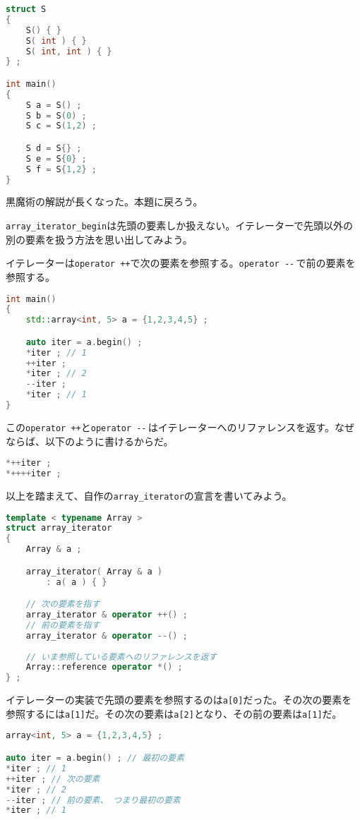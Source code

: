 \begin{lstlisting}[language={C++}]
struct S
{
    S() { }
    S( int ) { }
    S( int, int ) { }
} ;

int main()
{
    S a = S() ;
    S b = S(0) ;
    S c = S(1,2) ;

    S d = S{} ;
    S e = S{0} ;
    S f = S{1,2} ;
}
\end{lstlisting}

黒魔術の解説が長くなった。本題に戻ろう。

\texttt{array\_iterator\_begin}は先頭の要素しか扱えない。イテレーターで先頭以外の別の要素を扱う方法を思い出してみよう。

イテレーターは\texttt{operator ++}で次の要素を参照する。\texttt{operator {-}{-}}\,で前の要素を参照する。

\begin{lstlisting}[language={C++}]
int main()
{
    std::array<int, 5> a = {1,2,3,4,5} ;

    auto iter = a.begin() ;
    *iter ; // 1
    ++iter ;
    *iter ; // 2
    --iter ;
    *iter ; // 1
}
\end{lstlisting}

この\texttt{operator ++}と\texttt{operator {-}{-}}\,はイテレーターへのリファレンスを返す。なぜならば、以下のように書けるからだ。

\begin{lstlisting}[language={C++}]
*++iter ;
*++++iter ;
\end{lstlisting}

以上を踏まえて、自作の\texttt{array\_iterator}の宣言を書いてみよう。

\begin{lstlisting}[language={C++}]
template < typename Array >
struct array_iterator
{
    Array & a ;

    array_iterator( Array & a )
        : a( a ) { }

    // 次の要素を指す
    array_iterator & operator ++() ;
    // 前の要素を指す
    array_iterator & operator --() ;
    
    // いま参照している要素へのリファレンスを返す
    Array::reference operator *() ;
} ;
\end{lstlisting}

イテレーターの実装で先頭の要素を参照するのは\texttt{a[0]}だった。その次の要素を参照するには\texttt{a[1]}だ。その次の要素は\texttt{a[2]}となり、その前の要素は\texttt{a[1]}だ。

\begin{lstlisting}[language={C++}]
array<int, 5> a = {1,2,3,4,5} ;

auto iter = a.begin() ; // 最初の要素
*iter ; // 1
++iter ; // 次の要素
*iter ; // 2
--iter ; // 前の要素、 つまり最初の要素
*iter ; // 1
\end{lstlisting}

